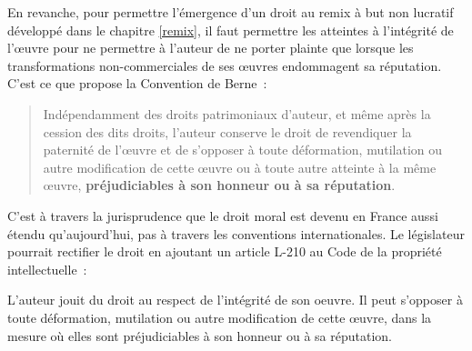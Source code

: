 En revanche, pour permettre l'émergence d'un droit au remix à but non lucratif développé dans le chapitre \ref{remix}, il faut permettre les atteintes à l'intégrité de l'œuvre pour ne permettre à l'auteur de ne porter plainte que lorsque les transformations non-commerciales de ses œuvres endommagent sa réputation. C'est ce que propose la Convention de Berne~:

\begin{quotation}
Indépendamment des droits patrimoniaux d’auteur, et même après la cession des dits droits, l’auteur conserve le droit de revendiquer la paternité de l’œuvre et de s’opposer à toute déformation, mutilation ou autre modification de cette œuvre ou à toute autre atteinte à la même œuvre, \textbf{préjudiciables à son honneur ou à sa réputation}.
\end{quotation}

C'est à travers la jurisprudence que le droit moral est devenu en France aussi étendu qu'aujourd'hui, pas à travers les conventions internationales. Le législateur pourrait rectifier le droit en ajoutant un article L-210 au Code de la propriété intellectuelle~:

\begin{mesure}
L’auteur jouit du droit au respect de l’intégrité de son oeuvre. Il peut s’opposer à toute déformation, mutilation ou autre modification de cette œuvre, dans la mesure où elles sont préjudiciables à son honneur ou à sa réputation.
\end{mesure}

